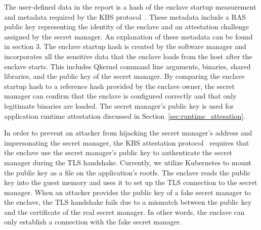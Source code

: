 The user-defined data in the report is a hash of the enclave startup measurement and metadata required by the KBS protocol~\cite*{kbs_Attestation_protocol}. These metadata include a RAS public key representing the identity of the enclave and an attestation challenge assigned by the secret manager. An explanation of these metadata can be found in section 3. The enclave startup hash is created by 
the software manager and incorporates all the sensitive data that the enclave loads from the host after the enclave starts. This includes Qkernel command line arguments, binaries, shared libraries, and the public key of the secret manager. By comparing the enclave startup hash to a reference hash provided by the enclave owner, the secret manager can confirm that 
the enclave is configured correctly and that only legitimate binaries are loaded. The secret manager's public key is used for application runtime attestation discussed in Section~\ref{sec:runtime_attesation}.

In order to prevent an attacker from hijacking the secret manager's address and impersonating the secret manager, the KBS attestation protocol~\cite*{kbs_Attestation_protocol} requires that the enclave use the secret manager's public key to authenticate the secret manager during the TLS handshake. Currently, we utilize Kubernetes to mount the public key as a file on the application's rootfs. 
The enclave reads the public key into the guest memory and uses it to set up the TLS connection to the secret manager. When an attacker provides the public key of a fake secret manager to the enclave, the TLS handshake fails due to a mismatch between the public key and the certificate of the real secret manager. In other words, the enclave can only establish a 
connection with the fake secret manager.

